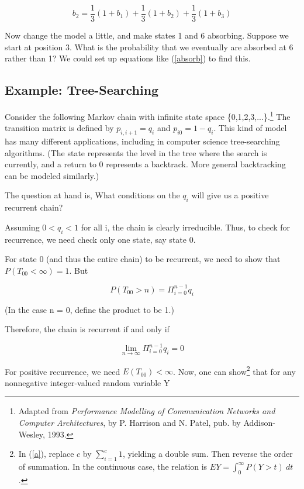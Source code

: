 \begin{equation}
b_2 = \frac{1}{3} (1+b_1) + \frac{1}{3} (1+b_2) + \frac{1}{3} (1+b_3)
\end{equation}

Now change the model a little, and make states 1 and 6 absorbing.
Suppose we start at position 3.  What is the probability that we
eventually are absorbed at 6 rather than 1?  We could set up equations
like (\ref{absorb}) to find this. 

\subsection{Example:  Tree-Searching}
\label{treesearch}

Consider the following Markov chain with infinite state space
\{0,1,2,3,...\}.\footnote{Adapted from {\it Performance Modelling of
Communication Networks and Computer Architectures}, by P. Harrison and
N. Patel, pub. by Addison-Wesley, 1993.} The transition matrix is
defined by $p_{i,i+1}=q_{i}$ and $p_{i0}=1-q_{i}$. This kind of model
has many different applications, including in computer science
tree-searching algorithms.  (The state represents the level in the tree
where the search is currently, and a return to 0 represents a backtrack.
More general backtracking can be modeled similarly.)

The question at hand is, What conditions on the $q_{i}$ will give us
a positive recurrent chain?

Assuming $0<q_{i}<1$ for all i, the chain is clearly irreducible.
Thus, to check for recurrence, we need check only one state, say state
0.

For state 0 (and thus the entire chain) to be recurrent, we need to show
that $P(T_{00}<\infty )=1$. But

\begin{equation}
P(T_{00}>n)=\Pi_{i=0}^{n-1}q_{i}
\end{equation}

(In the case n = 0, define the product to be 1.)

Therefore, the chain is recurrent if and only if 

\begin{equation}
\lim_{n\rightarrow \infty }\Pi_{i=0}^{n-1}q_{i}=0
\end{equation}

For positive recurrence, we need $E(T_{00})<\infty$. Now, one can
show\footnote{In (\ref{a}), replace $c$ by $\sum_{i=1}^c 1$, yielding a
double sum.  Then reverse the order of summation.  In the continuous
case, the relation is $EY = \int_{0}^{\infty} P(Y > t) ~ dt$.}  that for
any nonnegative integer-valued random variable Y

